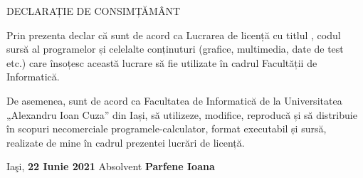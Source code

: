 \hfill \break
\hfill \break

\begin{center}
	\large{DECLARAȚIE DE CONSIMȚĂMÂNT}
\end{center}

\hfill \break

Prin prezenta declar că sunt de acord ca Lucrarea de licență cu titlul , codul sursă al programelor și celelalte conținuturi (grafice, multimedia, date de test etc.) care însoțesc această lucrare să fie utilizate în cadrul Facultății de Informatică.

De asemenea, sunt de acord ca Facultatea de Informatică de la Universitatea „Alexandru Ioan Cuza” din Iași, să utilizeze, modifice, reproducă și să distribuie în scopuri necomerciale programele-calculator, format executabil și sursă, realizate de mine în cadrul prezentei lucrări de licență.
 

\hfill \break
\hfill \break

Iaşi, \textbf{22 Iunie 2021} \hfill Absolvent  \textbf{Parfene Ioana}\\

\newpage